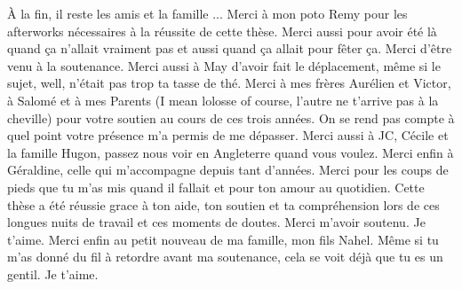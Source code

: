 \`A la fin, il reste les amis et la famille ...
Merci à mon poto Remy pour les afterworks nécessaires
à la réussite de cette thèse. Merci aussi pour avoir été
là quand ça n'allait vraiment pas et aussi quand ça
allait pour fêter ça. Merci d'être venu à la soutenance.
Merci aussi à May d'avoir fait le déplacement, même
si le sujet, well, n'était pas trop ta tasse de thé.
Merci à mes frères Aurélien et Victor, à Salomé et à mes
Parents (I mean lolosse of course, l'autre ne t'arrive pas
à la cheville) pour votre soutien au cours de ces trois années.
On se rend pas compte à quel point votre présence m'a permis de
me dépasser. Merci aussi à JC, Cécile et la famille Hugon, passez 
nous voir en Angleterre quand vous voulez. Merci enfin à Géraldine, celle qui 
m'accompagne depuis tant d'années. Merci pour les coups
de pieds que tu m'as mis quand il fallait et pour ton
amour au quotidien. Cette thèse a été réussie grace à ton aide,
ton soutien et ta compréhension lors de ces longues nuits 
de travail et ces moments de doutes. Merci m’avoir soutenu. Je t'aime.
Merci enfin au petit nouveau de ma famille, mon fils Nahel.
Même si tu m'as donné du fil à retordre avant ma soutenance,
cela se voit déjà que tu es un gentil. Je t'aime.

